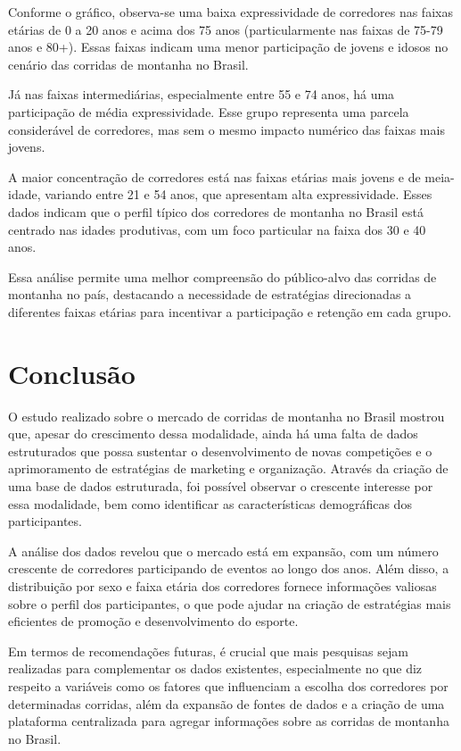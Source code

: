 Conforme o gráfico, observa-se uma baixa expressividade de corredores nas faixas etárias de 0 a 20 anos e acima dos 75 anos (particularmente nas faixas de 75-79 anos e 80+). Essas faixas indicam uma menor participação de jovens e idosos no cenário das corridas de montanha no Brasil.

Já nas faixas intermediárias, especialmente entre 55 e 74 anos, há uma participação de média expressividade. Esse grupo representa uma parcela considerável de corredores, mas sem o mesmo impacto numérico das faixas mais jovens.

A maior concentração de corredores está nas faixas etárias mais jovens e de meia-idade, variando entre 21 e 54 anos, que apresentam alta expressividade. Esses dados indicam que o perfil típico dos corredores de montanha no Brasil está centrado nas idades produtivas, com um foco particular na faixa dos 30 e 40 anos.

Essa análise permite uma melhor compreensão do público-alvo das corridas de montanha no país, destacando a necessidade de estratégias direcionadas a diferentes faixas etárias para incentivar a participação e retenção em cada grupo.



\section{Conclusão}

O estudo realizado sobre o mercado de corridas de montanha no Brasil mostrou que, apesar do crescimento dessa modalidade, ainda há uma falta de dados estruturados que possa sustentar o desenvolvimento de novas competições e o aprimoramento de estratégias de marketing e organização. Através da criação de uma base de dados estruturada, foi possível observar o crescente interesse por essa modalidade, bem como identificar as características demográficas dos participantes.

A análise dos dados revelou que o mercado está em expansão, com um número crescente de corredores participando de eventos ao longo dos anos. Além disso, a distribuição por sexo e faixa etária dos corredores fornece informações valiosas sobre o perfil dos participantes, o que pode ajudar na criação de estratégias mais eficientes de promoção e desenvolvimento do esporte.

Em termos de recomendações futuras, é crucial que mais pesquisas sejam realizadas para complementar os dados existentes, especialmente no que diz respeito a variáveis como os fatores que influenciam a escolha dos corredores por determinadas corridas, além da expansão de fontes de dados e a criação de uma plataforma centralizada para agregar informações sobre as corridas de montanha no Brasil.

